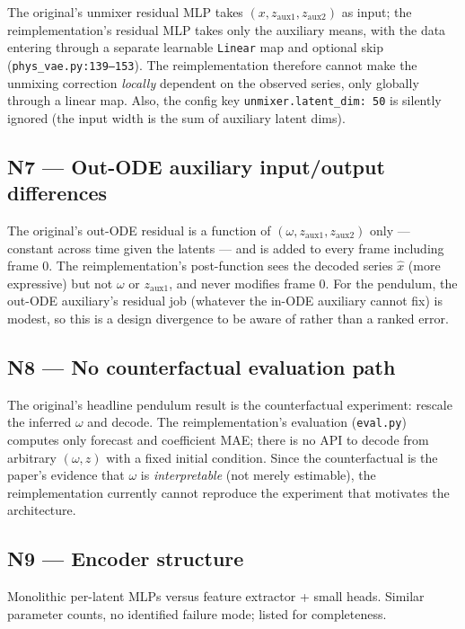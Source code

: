 \documentclass[11pt,a4paper]{article}
\newcommand{\code}[1]{\texttt{#1}}
\begin{document}
The original's unmixer residual MLP takes $(x, z_{\mathrm{aux1}},
z_{\mathrm{aux2}})$ as input; the reimplementation's residual MLP takes only
the auxiliary means, with the data entering through a separate learnable
\code{Linear} map and optional skip (\code{phys\_vae.py:139--153}). The
reimplementation therefore cannot make the unmixing correction
\emph{locally} dependent on the observed series, only globally through a
linear map. Also, the config key \code{unmixer.latent\_dim: 50} is silently
ignored (the input width is the sum of auxiliary latent dims).

\subsection*{N7 --- Out-ODE auxiliary input/output differences}

The original's out-ODE residual is a function of $(\omega, z_{\mathrm{aux1}},
z_{\mathrm{aux2}})$ only --- constant across time given the latents --- and is
added to every frame including frame 0. The reimplementation's post-function
sees the decoded series $\hat{x}$ (more expressive) but not $\omega$ or
$z_{\mathrm{aux1}}$, and never modifies frame 0. For the pendulum, the
out-ODE auxiliary's residual job (whatever the in-ODE auxiliary cannot fix)
is modest, so this is a design divergence to be aware of rather than a
ranked error.

\subsection*{N8 --- No counterfactual evaluation path}

The original's headline pendulum result is the counterfactual experiment:
rescale the inferred $\omega$ and decode. The reimplementation's evaluation
(\code{eval.py}) computes only forecast and coefficient MAE; there is no API
to decode from arbitrary $(\omega, z)$ with a fixed initial condition. Since
the counterfactual is the paper's evidence that $\omega$ is
\emph{interpretable} (not merely estimable), the reimplementation currently
cannot reproduce the experiment that motivates the architecture.

\subsection*{N9 --- Encoder structure}

Monolithic per-latent MLPs versus feature extractor + small heads. Similar
parameter counts, no identified failure mode; listed for completeness.
\end{document}
